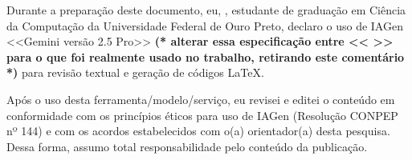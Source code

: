 \begin{declaracaousoia}

Durante a preparação deste documento, eu, \imprimirautor, estudante de graduação em Ciência da Computação da Universidade Federal de Ouro Preto, declaro o uso de IAGen <<Gemini versão 2.5 Pro>> \textbf{(* alterar essa especificação entre << >> para o que foi realmente usado no trabalho, retirando este comentário *)} para revisão textual e geração de códigos LaTeX.

Após o uso desta ferramenta/modelo/serviço, eu revisei e editei o conteúdo em conformidade com os princípios éticos para uso de IAGen (Resolução CONPEP nº 144) e com os acordos estabelecidos com o(a) orientador(a) desta pesquisa. Dessa forma, assumo total responsabilidade pelo conteúdo da publicação.

\end{declaracaousoia}
